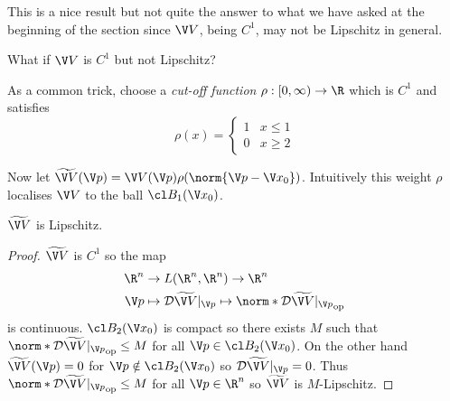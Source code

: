 \documentclass[a4paper]{article}
\newcommand*{\D}{\mathcal{D}}
\newcommand*{\nop}[1]{\norm*{#1}_{\text{op}}}
\theoremstyle{definition}
\begin{document}
This is a nice result but not quite the answer to what we have asked at the beginning of the section since \(\V V\), being \(C^1\), may not be Lipschitz in general.

\begin{question}
  What if \(\V V\) is \(C^1\) but not Lipschitz?
\end{question}

As a common trick, choose a \emph{cut-off function} \(\rho: [0, \infty) \to \R\) which is \(C^1\) and satisfies
\[
  \rho(x) =
  \begin{cases}
    1 & x \leq 1 \\
    0 & x \geq 2
  \end{cases}
\]

\begin{center}
\end{center}

Now let \(\widetilde{\V V}(\V p) = \V V(\V p)\rho(\norm{\V p - \V x_0})\). Intuitively this weight \(\rho\) localises \(\V V\) to the ball \(\cl B_1(\V x_0)\).

\begin{lemma}
  \(\widetilde{\V V}\) is Lipschitz.
\end{lemma}

\begin{proof}
  \(\widetilde{\V V}\) is \(C^1\) so the map
  \begin{align*}
    \R^n &\to L(\R^n, \R^n) \to \R^n \\
    \V p &\mapsto \D \widetilde{\V V}|_{\V p} \mapsto \nop{\D \widetilde{\V V}|_{\V p}}
  \end{align*}
  is continuous. \(\cl B_2(\V x_0)\) is compact so there exists \(M\) such that \(\nop{\D \widetilde{\V V}|_{\V p}} \leq M\) for all \(\V p \in \cl B_2(\V x_0)\). On the other hand \(\widetilde{\V V}(\V p) = 0\) for \(\V p \notin \cl B_2(\V x_0)\) so \(\D \widetilde{\V V}|_{\V p} = 0\). Thus \(\nop{\D \widetilde{\V V}|_{\V p}} \leq M\) for all \(\V p \in \R^n\) so \(\widetilde{\V V}\) is \(M\)-Lipschitz.
\end{proof}
\end{document}
